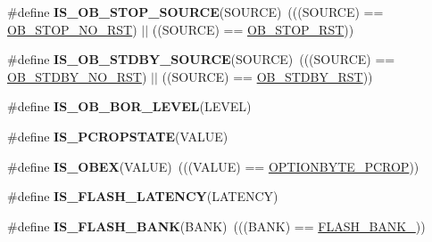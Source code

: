 \begin{DoxyCompactItemize}
\item 
\#define {\bfseries I\+S\+\_\+\+O\+B\+\_\+\+S\+T\+O\+P\+\_\+\+S\+O\+U\+R\+CE}(S\+O\+U\+R\+CE)~(((S\+O\+U\+R\+CE) == \hyperlink{group___f_l_a_s_h_ex___option___bytes__n_r_s_t___s_t_o_p_ga7344fe0ec25c5eb2d11db7c855325436}{O\+B\+\_\+\+S\+T\+O\+P\+\_\+\+N\+O\+\_\+\+R\+ST}) $\vert$$\vert$ ((S\+O\+U\+R\+CE) == \hyperlink{group___f_l_a_s_h_ex___option___bytes__n_r_s_t___s_t_o_p_gaef92c03b1f279c532bfa13d3bb074b57}{O\+B\+\_\+\+S\+T\+O\+P\+\_\+\+R\+ST}))\hypertarget{group___f_l_a_s_h_ex___i_s___f_l_a_s_h___definitions_ga131ae3434f300c8317dd6b3b349c7cab}{}\label{group___f_l_a_s_h_ex___i_s___f_l_a_s_h___definitions_ga131ae3434f300c8317dd6b3b349c7cab}

\item 
\#define {\bfseries I\+S\+\_\+\+O\+B\+\_\+\+S\+T\+D\+B\+Y\+\_\+\+S\+O\+U\+R\+CE}(S\+O\+U\+R\+CE)~(((S\+O\+U\+R\+CE) == \hyperlink{group___f_l_a_s_h_ex___option___bytes__n_r_s_t___s_t_d_b_y_gad776ed7b3b9a98013aac9976eedb7e94}{O\+B\+\_\+\+S\+T\+D\+B\+Y\+\_\+\+N\+O\+\_\+\+R\+ST}) $\vert$$\vert$ ((S\+O\+U\+R\+CE) == \hyperlink{group___f_l_a_s_h_ex___option___bytes__n_r_s_t___s_t_d_b_y_ga69451a6f69247528f58735c9c83499ce}{O\+B\+\_\+\+S\+T\+D\+B\+Y\+\_\+\+R\+ST}))\hypertarget{group___f_l_a_s_h_ex___i_s___f_l_a_s_h___definitions_ga8a05393df3a5e89551b4e2e1e8c5b884}{}\label{group___f_l_a_s_h_ex___i_s___f_l_a_s_h___definitions_ga8a05393df3a5e89551b4e2e1e8c5b884}

\item 
\#define {\bfseries I\+S\+\_\+\+O\+B\+\_\+\+B\+O\+R\+\_\+\+L\+E\+V\+EL}(L\+E\+V\+EL)
\item 
\#define {\bfseries I\+S\+\_\+\+P\+C\+R\+O\+P\+S\+T\+A\+TE}(V\+A\+L\+UE)
\item 
\#define {\bfseries I\+S\+\_\+\+O\+B\+EX}(V\+A\+L\+UE)~(((V\+A\+L\+UE) == \hyperlink{group___f_l_a_s_h_ex___advanced___option___type_gade16326e09bd923b54f1ec8622a7bc4b}{O\+P\+T\+I\+O\+N\+B\+Y\+T\+E\+\_\+\+P\+C\+R\+OP}))\hypertarget{group___f_l_a_s_h_ex___i_s___f_l_a_s_h___definitions_gac5890fc0709a4b8112a314cb0e58c5c8}{}\label{group___f_l_a_s_h_ex___i_s___f_l_a_s_h___definitions_gac5890fc0709a4b8112a314cb0e58c5c8}

\item 
\#define {\bfseries I\+S\+\_\+\+F\+L\+A\+S\+H\+\_\+\+L\+A\+T\+E\+N\+CY}(L\+A\+T\+E\+N\+CY)
\item 
\#define {\bfseries I\+S\+\_\+\+F\+L\+A\+S\+H\+\_\+\+B\+A\+NK}(B\+A\+NK)~(((B\+A\+NK) == \hyperlink{group___f_l_a_s_h_ex___banks_ga8ac3f24496e5de6a2f6bd3ff77f0ca53}{F\+L\+A\+S\+H\+\_\+\+B\+A\+N\+K\+\_}))\hypertarget{group___f_l_a_s_h_ex___i_s___f_l_a_s_h___definitions_ga13845f67e09ef81901c6fa683f13f086}{}\label{group___f_l_a_s_h_ex___i_s___f_l_a_s_h___definitions_ga13845f67e09ef81901c6fa683f13f086}


\end{DoxyCompactItemize}
